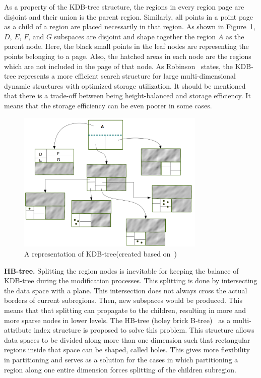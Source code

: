 \documentclass[a4paper,12pt]{article}
\begin{document}
As a property of the KDB-tree structure, the regions in every region page are disjoint and their union is the parent region. %
Similarly, all points in a point page as a child of a region are placed necessarily in that region.
As shown in Figure~\ref{figkdbtree}, $D$, $E$, $F$, and $G$ subspaces are disjoint and shape together the region $A$ as the parent node. Here, the black small points in the leaf nodes are representing the points belonging to a page. Also, the hatched areas in each node are the regions which are not included in the page of that node. 
As Robinson~\cite{kdbtree} states, the KDB-tree represents a more efficient search structure for large multi-dimensional dynamic structures with optimized storage utilization. It should be mentioned that there is a trade-off between being height-balanced and storage efficiency. It means that the storage efficiency can be even poorer in some cases.

\begin{figure}
\centering
\includegraphics[width=0.8\textwidth]{kdbtree}
\caption{A representation of KDB-tree(created based on~\cite{kdbtree})}
\label{figkdbtree}
\end{figure}

\textbf{HB-tree.} 
Splitting the region nodes is inevitable for keeping the balance of KDB-tree during the modification processes. This splitting is done by intersecting the data space with a plane. This intersection does not always cross the actual borders of current subregions. Then, new subspaces would be produced. This means that that splitting can propagate to the children, resulting in more and more sparse nodes in lower levels. The HB-tree (holey brick B-tree)~\cite{hbtree1} as a multi-attribute index structure is proposed to solve this problem. This structure allows data spaces to be divided along more than one dimension such that rectangular regions inside that space can be shaped, called holes.
This gives more flexibility in partitioning and serves as a solution for the cases in which partitioning a region along one entire dimension forces splitting of the children subregion. 
\end{document}
